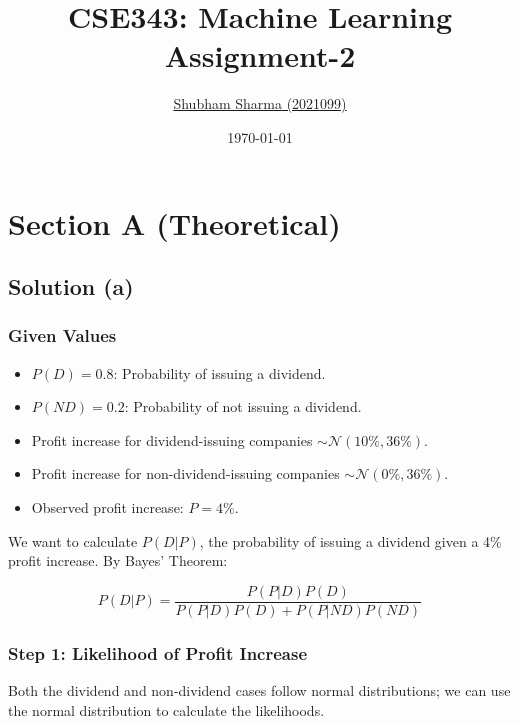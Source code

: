 \documentclass{article}
\title{
    \textbf{CSE343: Machine Learning} \\ \vspace*{-5pt}
    \textbf{\large{Assignment-2}}
}
\author{\href{mailto:shubham21099@iiitd.ac.in}{Shubham Sharma (2021099)}}
\date{\today}
\begin{document}
\maketitle


\section{Section A (Theoretical)}

\subsection*{Solution (a)}
\subsubsection*{Given Values}

\begin{itemize}
    \item $P(D) = 0.8$: Probability of issuing a dividend.
    \item $P(ND) = 0.2$: Probability of not issuing a dividend.
    \item Profit increase for dividend-issuing companies $\sim \mathcal{N}(10\%, 36\%)$.
    \item Profit increase for non-dividend-issuing companies $\sim \mathcal{N}(0\%, 36\%)$.
    \item Observed profit increase: $P = 4\%$.
\end{itemize}

\hspace{-20pt}
We want to calculate $P(D | P)$, the probability of issuing a dividend given a 4\% profit increase. By Bayes' Theorem:

\[
P(D | P) = \frac{P(P | D) P(D)}{P(P | D) P(D) + P(P | ND) P(ND)}
\]

\subsubsection*{Step 1: Likelihood of Profit Increase}

Both the dividend and non-dividend cases follow normal distributions; we can use the normal distribution to calculate the likelihoods.
\end{document}
